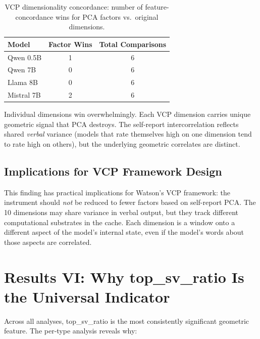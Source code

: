 \documentclass[11pt,a4paper]{article}
\begin{document}
\begin{table}[H]
\centering
\caption{VCP dimensionality concordance: number of feature-concordance wins for PCA factors vs.\ original dimensions.}
\label{tab:exp_c}
\begin{tabular}{lcc}
\toprule
\textbf{Model} & \textbf{Factor Wins} & \textbf{Total Comparisons} \\
\midrule
Qwen 0.5B  & 1 & 6 \\
Qwen 7B    & 0 & 6 \\
Llama 8B   & 0 & 6 \\
Mistral 7B & 2 & 6 \\
\bottomrule
\end{tabular}
\end{table}

Individual dimensions win overwhelmingly. Each VCP dimension carries unique geometric signal that PCA destroys. The self-report intercorrelation reflects shared \emph{verbal} variance (models that rate themselves high on one dimension tend to rate high on others), but the underlying geometric correlates are distinct.

\subsection{Implications for VCP Framework Design}

This finding has practical implications for Watson's VCP framework: the instrument should \emph{not} be reduced to fewer factors based on self-report PCA. The 10 dimensions may share variance in verbal output, but they track different computational substrates in the cache. Each dimension is a window onto a different aspect of the model's internal state, even if the model's words about those aspects are correlated.

\section{Results VI: Why top\_sv\_ratio Is the Universal Indicator}

Across all analyses, top\_sv\_ratio is the most consistently significant geometric feature. The per-type analysis reveals why:
\end{document}
